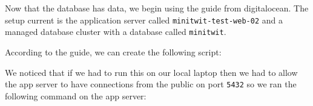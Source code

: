 

Now that the database has data, we begin using the guide from digitalocean. The setup current is the application server called \texttt{minitwit-test-web-02} and a managed database cluster with a database called \texttt{minitwit}.

According to the guide, we can create the following script:




We noticed that if we had to run this on our local laptop then we had to allow the app server to have connections from the public on port \texttt{5432} so we ran the following command on the app server:


